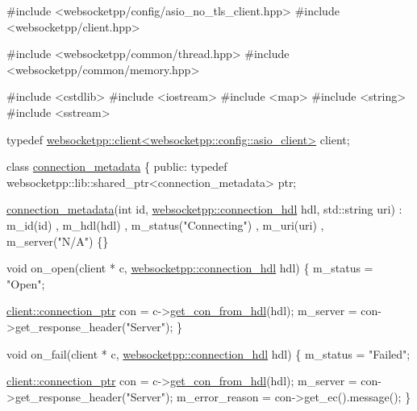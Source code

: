 \begin{DoxyCode}
\textcolor{preprocessor}{#include <websocketpp/config/asio\_no\_tls\_client.hpp>}
\textcolor{preprocessor}{#include <websocketpp/client.hpp>}

\textcolor{preprocessor}{#include <websocketpp/common/thread.hpp>}
\textcolor{preprocessor}{#include <websocketpp/common/memory.hpp>}

\textcolor{preprocessor}{#include <cstdlib>}
\textcolor{preprocessor}{#include <iostream>}
\textcolor{preprocessor}{#include <map>}
\textcolor{preprocessor}{#include <string>}
\textcolor{preprocessor}{#include <sstream>}

\textcolor{keyword}{typedef} \hyperlink{classwebsocketpp_1_1client}{websocketpp::client<websocketpp::config::asio\_client>}
       client;

\textcolor{keyword}{class }\hyperlink{classconnection__metadata}{connection\_metadata} \{
\textcolor{keyword}{public}:
    \textcolor{keyword}{typedef} websocketpp::lib::shared\_ptr<connection\_metadata> ptr;

    \hyperlink{classconnection__metadata}{connection\_metadata}(\textcolor{keywordtype}{int} \textcolor{keywordtype}{id}, \hyperlink{namespacewebsocketpp_a6b3d26a10ee7229b84b776786332631d}{websocketpp::connection\_hdl} 
      hdl, std::string uri)
      : m\_id(id)
      , m\_hdl(hdl)
      , m\_status(\textcolor{stringliteral}{"Connecting"})
      , m\_uri(uri)
      , m\_server(\textcolor{stringliteral}{"N/A"})
    \{\}

    \textcolor{keywordtype}{void} on\_open(client * c, \hyperlink{namespacewebsocketpp_a6b3d26a10ee7229b84b776786332631d}{websocketpp::connection\_hdl} hdl) \{
        m\_status = \textcolor{stringliteral}{"Open"};

        \hyperlink{classwebsocketpp_1_1client_a2e187bbb2beac676bbfbc2e8065de83e}{client::connection\_ptr} con = c->\hyperlink{classwebsocketpp_1_1endpoint_a0fe4457427d4124abe7ca022ba7afbb4}{get\_con\_from\_hdl}(hdl);
        m\_server = con->get\_response\_header(\textcolor{stringliteral}{"Server"});
    \}

    \textcolor{keywordtype}{void} on\_fail(client * c, \hyperlink{namespacewebsocketpp_a6b3d26a10ee7229b84b776786332631d}{websocketpp::connection\_hdl} hdl) \{
        m\_status = \textcolor{stringliteral}{"Failed"};

        \hyperlink{classwebsocketpp_1_1client_a2e187bbb2beac676bbfbc2e8065de83e}{client::connection\_ptr} con = c->\hyperlink{classwebsocketpp_1_1endpoint_a0fe4457427d4124abe7ca022ba7afbb4}{get\_con\_from\_hdl}(hdl);
        m\_server = con->get\_response\_header(\textcolor{stringliteral}{"Server"});
        m\_error\_reason = con->get\_ec().message();
    \}


\end{DoxyCode}
